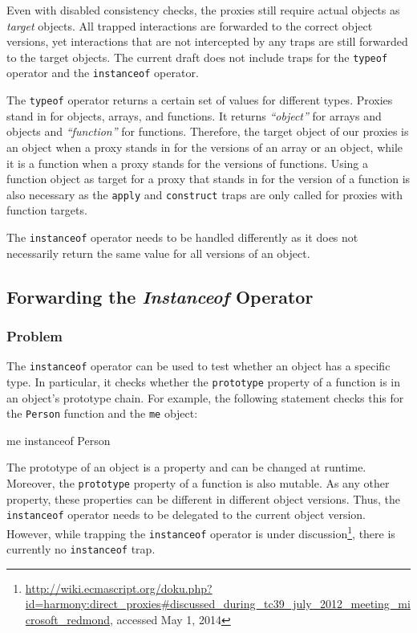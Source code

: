 Even with disabled consistency checks, the proxies still require actual objects as \emph{target} objects.
All trapped interactions are forwarded to the correct object versions, yet interactions that are not intercepted by any traps are still forwarded to the target objects.
The current draft does not include traps for the \lstinline{typeof} operator and the \lstinline{instanceof} operator.

The \lstinline{typeof} operator returns a certain set of values for different types.
Proxies stand in for objects, arrays, and functions.
It returns \emph{``object''} for arrays and objects and \emph{``function''} for functions.
Therefore, the target object of our proxies is an object when a proxy stands in for the versions of an array or an object, while it is a function when a proxy stands for the versions of functions.
Using a function object as target for a proxy that stands in for the version of a function is also necessary as the \lstinline{apply} and \lstinline{construct} traps are only called for proxies with function targets.

The \lstinline{instanceof} operator needs to be handled differently as it does not necessarily return the same value for all versions of an object.


\subsection{Forwarding the \emph{Instanceof} Operator}

\subsubsection{Problem}

The \lstinline{instanceof} operator can be used to test whether an object has a specific type.
In particular, it checks whether the \lstinline{prototype} property of a function is in an object's prototype chain.
For example, the following statement checks this for the \lstinline{Person} function and the \lstinline{me} object:

\begin{code}{}{}
me instanceof Person
\end{code}
\iffalse
\end{verbatim}\fi

The prototype of an object is a property and can be changed at runtime.
Moreover, the \lstinline{prototype} property of a function is also mutable.
As any other property, these properties can be different in different object versions.
Thus, the \lstinline{instanceof} operator needs to be delegated to the current object version.
However, while trapping the \lstinline{instanceof} operator is under discussion\footnote{\url{http://wiki.ecmascript.org/doku.php?id=harmony:direct_proxies\#discussed_during_tc39_july_2012_meeting_microsoft_redmond}, accessed May 1, 2014}, there is currently no \lstinline{instanceof} trap.

